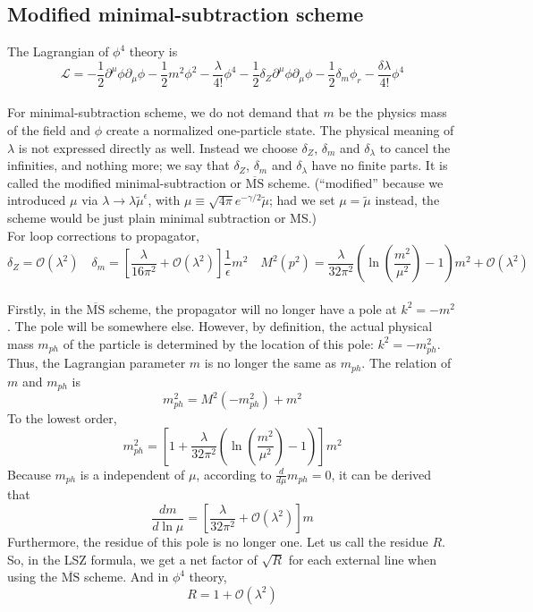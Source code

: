 \subsection{Modified minimal-subtraction scheme}
The Lagrangian of $\phi^4$ theory is
\[\mathcal{L} = -\frac{1}{2} \partial^{\mu} \phi \partial_{\mu} \phi -\frac{1}{2}m^2 \phi^2 - \frac{\lambda}{4!}\phi^4 -\frac{1}{2} \delta_Z \partial^{\mu} \phi \partial_{\mu} \phi -\frac{1}{2}\delta_m \phi_r - \frac{\delta \lambda}{4!}\phi^4\]
\\
For minimal-subtraction scheme, we do not demand that $m$ be the physics mass of the field and $\phi$  create a normalized one-particle state. The physical meaning of $\lambda$ is not expressed directly as well. Instead we choose $\delta_Z$, $\delta_m$ and $\delta_{\lambda}$ to cancel the infinities, and nothing more;
we say that $\delta_Z$, $\delta_m$ and $\delta_{\lambda}$ have no finite parts. It is called the modified minimal-subtraction or $\mathrm{\overline{MS}}$ scheme. (``modified'' because we introduced $\mu$ via  $\lambda \to \lambda \tilde{\mu}^{\epsilon}$, with $\mu \equiv  \sqrt{4\pi} e^{-\gamma/2} \tilde{\mu}$; had we set $\mu = \tilde{\mu}$ instead, the scheme would be just plain minimal subtraction or MS.)
\\
For loop corrections to propagator,
\[\delta_Z=\mathcal{O}(\lambda^2) \quad \delta_m = \left[ \frac{\lambda}{16\pi^2} + \mathcal{O}(\lambda^2) \right]\frac{1}{\epsilon}m^2 \quad M^2(p^2) = \frac{\lambda}{32\pi^2}( \ln(\frac{m^2}{\mu^2})-1)m^2 + \mathcal{O}(\lambda^2)\]
\\
Firstly, in the $\mathrm{\overline{MS}}$ scheme, the propagator will no longer have a pole at $k^2=-m^2$. The pole will be somewhere else. However, by definition, the actual physical mass $m_{ph}$ of the particle is determined by the location of this pole: $k^2 = -m_{ph}^2$. Thus, the Lagrangian parameter $m$ is no longer the same as $m_{ph}$. The relation of $m$ and $m_{ph}$ is 
\[m_{ph}^2 = M^2(-m_{ph}^2) + m^2\]
To the lowest order, 
\[m_{ph}^2 = \left[1+\frac{\lambda}{32\pi^2}( \ln(\frac{m^2}{\mu^2})-1)\right] m^2\]
Because $m_{ph}$ is a independent of $\mu$, according to $\frac{d}{d\mu} m_{ph} = 0$, it can be derived that
\[\frac{dm}{d\ln \mu} = \left[\frac{\lambda}{32\pi^2}+\mathcal{O}(\lambda^2)\right] m\]
Furthermore, the residue of this pole is no longer one. Let us call the residue $R$. So, in the LSZ formula, we get a net factor of $\sqrt{R}$ for each external line when using the $\mathrm{\overline{MS}}$ scheme. And in $\phi^4$ theory,
\[R = 1 + \mathcal{O}(\lambda^2)\]
